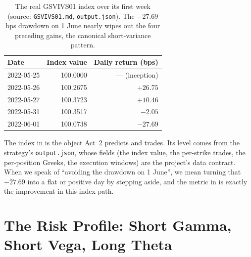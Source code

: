 \begin{table}[ht]
\centering
\caption{The real GSVIVS01 index over its first week (source: \texttt{GSVIVS01.md}, \texttt{output.json}). The $-27.69$ bps drawdown on 1 June nearly wipes out the four preceding gains, the canonical short-variance pattern.}
\label{tab:gsvivs:index}
\begin{tabular}{lrr}
\toprule
Date & Index value & Daily return (bps) \\
\midrule
2022-05-25 & 100.0000 & --- (inception) \\
2022-05-26 & 100.2675 & $+26.75$ \\
2022-05-27 & 100.3723 & $+10.46$ \\
2022-05-31 & 100.3517 & $-2.05$ \\
2022-06-01 & 100.0738 & $-27.69$ \\
\bottomrule
\end{tabular}
\end{table}

\begin{projectconnection}
The index in  is the object Act~2 predicts and trades. Its level comes from the strategy's \texttt{output.json}, whose fields (the index value, the per-strike trades, the per-position Greeks, the execution windows) are the project's data contract. When we speak of ``avoiding the drawdown on 1 June'', we mean turning that $-27.69$ into a flat or positive day by stepping aside, and the metric in  is exactly the improvement in this index path.
\end{projectconnection}

\section{The Risk Profile: Short Gamma, Short Vega, Long Theta}
\label{sec:gsvivs:risk-profile}

